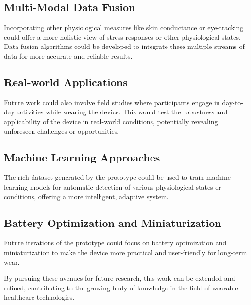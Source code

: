 \subsection{Multi-Modal Data Fusion}
Incorporating other physiological measures like skin conductance or eye-tracking could offer a more holistic view of stress responses or other physiological states. 
Data fusion algorithms could be developed to integrate these multiple streams of data for more accurate and reliable results.

\subsection{Real-world Applications}
Future work could also involve field studies where participants engage in day-to-day activities while wearing the device. 
This would test the robustness and applicability of the device in real-world conditions, potentially revealing unforeseen challenges or opportunities.

\subsection{Machine Learning Approaches}
The rich dataset generated by the prototype could be used to train machine learning models for automatic detection of various physiological states or conditions, offering a more intelligent, adaptive system.

\subsection{Battery Optimization and Miniaturization}
Future iterations of the prototype could focus on battery optimization and miniaturization to make the device more practical and user-friendly for long-term wear.

By pursuing these avenues for future research, this work can be extended and refined, contributing to the growing body of knowledge in the field of wearable healthcare technologies.

